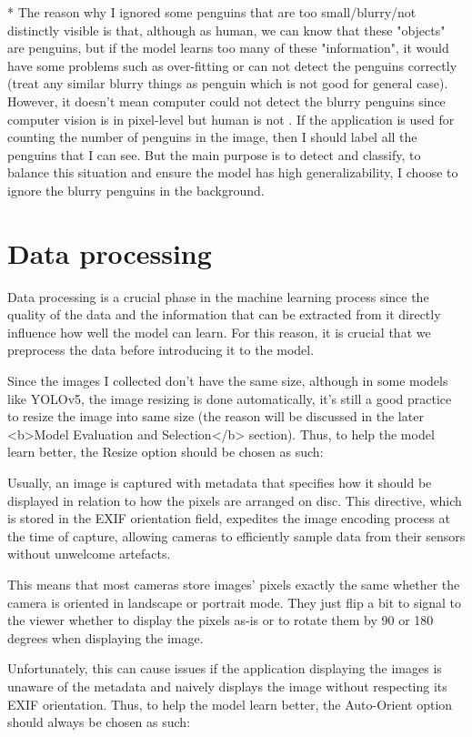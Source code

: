 \documentclass[runningheads]{llncs}
\begin{document}
* The reason why I ignored some penguins that are too small/blurry/not distinctly visible is that, although as human, we can know that these "objects" are penguins, but if the model learns too many of these "information", it would have some problems such as over-fitting or can not detect the penguins correctly (treat any similar blurry things as penguin which is not good for general case). However, it doesn't mean computer could not detect the blurry penguins since computer vision is in pixel-level but human is not . If the application is used for counting the number of penguins in the image, then I should label all the penguins that I can see. But the main purpose is to detect and classify, to balance this situation and ensure the model has high generalizability, I choose to ignore the blurry penguins in the background.

\section{Data processing}
Data processing is a crucial phase in the machine learning process since the quality of the data and the information that can be extracted from it directly influence how well the model can learn. For this reason, it is crucial that we preprocess the data before introducing it to the model.

Since the images I collected don't have the same size, although in some models like YOLOv5, the image resizing is done automatically, it's still a good practice to resize the image into same size (the reason will be discussed in the later <b>Model Evaluation and Selection</b> section). Thus, to help the model learn better, the Resize option should be chosen as such: 

Usually, an image is captured with metadata that specifies how it should be displayed in relation to how the pixels are arranged on disc. This directive, which is stored in the EXIF orientation field, expedites the image encoding process at the time of capture, allowing cameras to efficiently sample data from their sensors without unwelcome artefacts.

This means that most cameras store images' pixels exactly the same whether the camera is oriented in landscape or portrait mode. They just flip a bit to signal to the viewer whether to display the pixels as-is or to rotate them by 90 or 180 degrees when displaying the image.

Unfortunately, this can cause issues if the application displaying the images is unaware of the metadata and naively displays the image without respecting its EXIF orientation. Thus, to help the model learn better, the Auto-Orient option should always be chosen as such: 
\end{document}
